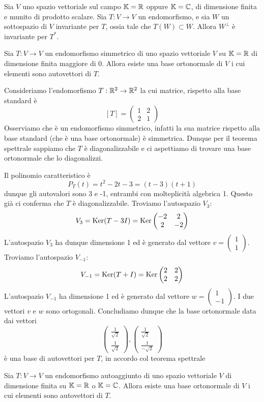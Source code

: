 \begin{lemma}
	Sia $V$ uno spazio vettoriale sul campo $\mathbb{K} = \mathbb{R}$ oppure
	$\mathbb{K} = \mathbb{C}$, di dimensione finita e munito di prodotto scalare.
	Sia $T : V \to V$ un endomorfismo, e sia $W$ un sottospazio di $V$ invariante
	per $T$, ossia tale che $T(W) \subset W$. Allora $W^\perp$ è invariante per
	$T^*$.
\end{lemma}

\begin{theorem}
	Sia $T : V  \to V$ un endomorfismo simmetrico di uno spazio vettoriale $V$ su
	$\mathbb{K} = \mathbb{R}$ di dimensione finita maggiore di 0. Allora esiste una
	base ortonormale di $V$ i cui elementi sono autovettori di $T$.
\end{theorem}

\begin{example}
	Consideriamo l'endomorfismo $T : \mathbb{R}^2 \to \mathbb{R}^2$ la cui matrice,
	rispetto alla base standard è
	\[
		[T] = \begin{pmatrix}
			1 & 2 \\
			2 & 1
		\end{pmatrix}
	\]
	Osserviamo che è un endomorfismo simmetrico, infatti la sua matrice rispetto
	alla base standard (che è una base ortonormale) è simmetrica. Dunque per
	il teorema spettrale sappiamo che $T$ è diagonalizzabile e ci aspettiamo di
	trovare una base ortonormale che lo diagonalizzi.

	Il polinomio caratteristico è
	\[
		P_T(t) = t^2 - 2t - 3 = (t - 3)(t + 1)
	\]
	dunque gli autovalori sono 3 e -1, entrambi con molteplicità algebrica 1.
	Questo già ci conferma che $T$ è diagonalizzabile. Troviamo l'autospazio
	$V_3$:
	\[
		V_3 = \operatorname{Ker}(T - 3I) = \operatorname{Ker} \begin{pmatrix}
			-2 & 2  \\
			2  & -2
		\end{pmatrix}
	\]
	L'autospazio $V_3$ ha dunque dimensione 1 ed è generato dal vettore
	$v = \begin{pmatrix} 1 \\ 1	\end{pmatrix}$. Troviamo l'autospazio $V_{-1}$:
	\[
		V_{-1} = \operatorname{Ker}(T + I) = \operatorname{Ker} \begin{pmatrix}
			2 & 2 \\
			2 & 2
		\end{pmatrix}
	\]
	L'autospazio $V_{-1}$ ha dimensione 1 ed è generato dal vettore
	$w = \begin{pmatrix} 1 \\ -1 \end{pmatrix}$. I due vettori $v$ e $w$ sono
	ortogonali. Concludiamo dunque che la base ortonormale data dai vettori
	\[
		\begin{pmatrix}
			\frac{1}{\sqrt{2}} \\ \frac{1}{\sqrt{2}}
		\end{pmatrix},
		\begin{pmatrix}
			\frac{1}{\sqrt{2}} \\ \frac{1}{-\sqrt{2}}
		\end{pmatrix}
	\]
	è una base di autovettori per $T$, in accordo col teorema spettrale
\end{example}

\begin{theorem}
	Sia $T : V  \to V$ un endomorfismo autoaggiunto di uno spazio vettoriale $V$ di
	dimensione finita su $\mathbb{K} = \mathbb{R}$ o $\mathbb{K} = \mathbb{C}$.
	Allora esiste una base ortonormale di $V$ i cui elementi sono autovettori di $T$.
\end{theorem}
